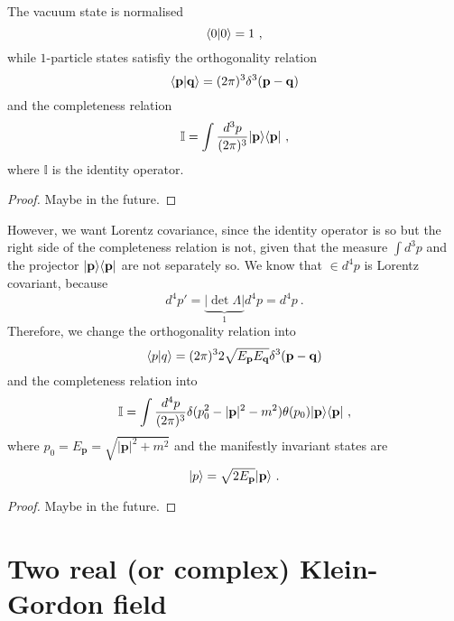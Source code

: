    The vacuum state is normalised 
    \begin{equation*}
        \langle0\vert0\rangle = 1 ~,
    \end{equation*}
    while $1$-particle states satisfiy the orthogonality relation 
    \begin{equation*}
        \langle\mathbf p\vert\mathbf q\rangle = (2\pi)^3 \delta^3 (\mathbf p - \mathbf q) 
    \end{equation*}
    and the completeness relation 
    \begin{equation*}
        \mathbb I = \int \frac{d^3 p}{(2 \pi)^3} \vert\mathbf p\rangle \langle\mathbf p\vert ~,
    \end{equation*}
    where $\mathbb I$ is the identity operator.
    \begin{proof}
        Maybe in the future.
    \end{proof}

    However, we want Lorentz covariance, since the identity operator is so but the right side of the completeness relation is not, given that the measure $\int d^3 p$ and the projector $\vert\mathbf p\rangle \langle\mathbf p\vert$ are not separately so. We know that $\in d^4 p$ is Lorentz covariant, because 
    \begin{equation*}
        d^4 p' = \underbrace{|\det \Lambda|}_1 d^4 p = d^4 p ~.
    \end{equation*}
    Therefore, we change the orthogonality relation into 
    \begin{equation*}
        \langle p\vert q\rangle = (2\pi)^3 2 \sqrt{E_{\mathbf p} E_{\mathbf q}} \delta^3 (\mathbf p - \mathbf q) 
    \end{equation*}
    and the completeness relation into 
    \begin{equation*}
        \mathbb I = \int \frac{d^4 p}{(2\pi)^3} \delta (p^2_0 - |\mathbf p|^2 - m^2) \theta(p_0) \vert\mathbf p\rangle \langle\mathbf p\vert ~,
    \end{equation*}
    where $p_0 = E_{\mathbf p} = \sqrt{|\mathbf p|^2 + m^2}$ and the manifestly invariant states are 
    \begin{equation}
        \vert p\rangle = \sqrt{2E_{\mathbf p}} \vert\mathbf p\rangle ~.
    \end{equation}
    \begin{proof}
        Maybe in the future.
    \end{proof}

\chapter{Two real (or complex) Klein-Gordon field}